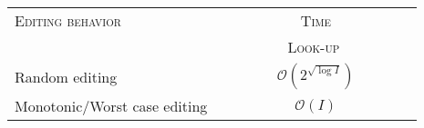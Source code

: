 
\begin{tabularx}{0.6\textwidth}{@{}Xc@{}}
  \toprule
  \textsc{Editing behavior} & \textsc{Time} \\
  & \ \ \ \ \ \ \ \ \ \textsc{Look-up} \ \ \ \ \ \ \ \ \ \\ \midrule
  Random editing & $\mathcal{O}(2^{\sqrt{\log I}})$ \\
  Monotonic/Worst case editing & $\mathcal{O}(I)$ \\ \bottomrule
\end{tabularx}

